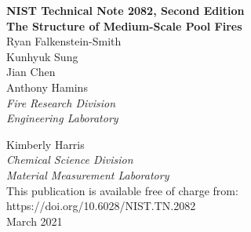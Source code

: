 \documentclass[12pt]{article}
\newcommand{\pubnumber}{2082, Second Edition}
\newcommand{\DOI}{https://doi.org/10.6028/NIST.TN.2082}
\newcommand{\monthyear}{March 2021}
\begin{document}
\begin{titlepage}
\begin{flushright}
\LARGE{\textbf{NIST Technical Note \pubnumber}}\\
\vfill
\Huge{\textbf{The Structure of Medium-Scale Pool Fires}}\\
\vfill
\normalsize Ryan Falkenstein-Smith\\
Kunhyuk Sung\\
Jian Chen\\
Anthony Hamins\\
\large
\textit{Fire Research Division}\\
\textit{Engineering Laboratory}\\
\vspace{12pt}
\vfill

\normalsize Kimberly Harris\\
\large
\textit{Chemical Science Division}\\
\textit{Material Measurement Laboratory}\\
\vspace{12pt}
\vfill
\normalsize This publication is available free of charge from:\\
\DOI\\
\vfill
\normalsize \monthyear
\vfill


\end{flushright}
\end{titlepage}
\end{document}
